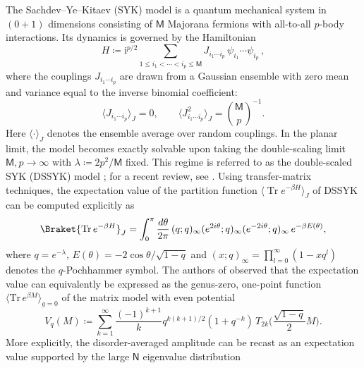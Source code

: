 \documentclass[a4paper,11pt,english]{article}
\theoremstyle{plain}
\theoremstyle{definition}
\theoremstyle{plain}
\DeclareMathOperator{\Tr}{Tr}
\newcommand{\ms}[1]{\mathsf{#1}}
\begin{document}
The Sachdev--Ye--Kitaev (SYK) model \cite{Sachdev:1992fk, Kitaev_talk, MaldacenaStanford} is a quantum mechanical system in $(0+1)$ dimensions consisting of $\ms{M}$ Majorana fermions with all-to-all $p$-body interactions. Its dynamics is governed by the Hamiltonian
\begin{equation}
    H
    \coloneqq
    \mathrm{i}^{p/2} \sum_{1 \leq i_1 < \cdots < i_p \leq \ms{M}} 
    J_{i_1 \cdots i_p} \, \psi_{i_1} \cdots \psi_{i_p}\, ,
\end{equation}
where the couplings $J_{i_1 \cdots i_p}$ are drawn from a Gaussian ensemble with zero mean and variance equal to the inverse binomial coefficient:
\begin{equation}
    \langle J_{i_1 \cdots i_p} \rangle_J = 0,
    \qquad
    \langle J_{i_1 \cdots i_p}^2 \rangle_J = \binom{\ms{M}}{p}^{-1}.
\end{equation}
Here $\langle \cdot \rangle_J$ denotes the ensemble average over random couplings. In the planar limit, the model becomes exactly solvable upon taking the double-scaling limit $\ms{M},p\to \infty$ with $\lambda \coloneqq 2p^2/\ms{M}$ fixed. This regime is referred to as the double-scaled SYK (DSSYK) model \cite{Cotler:2016fpe, Berkooz:2018qkz, Berkooz:2018jqr}; for a recent review, see \cite{BerkoozReview}. Using transfer-matrix techniques, the expectation value of the partition function $\langle \Tr e^{-\beta H} \rangle_J$ of DSSYK can be computed explicitly \cite{Erd_s_2014, Berkooz:2018qkz} as
\begin{equation}\label{eq:disk:amplitude}
    \Braket{ \Tr{e^{-\beta H}} }_J
    =
    \int_0^\pi \frac{d\theta}{2\pi} \,
        (q;q)_\infty
        (e^{2i\theta}; q )_\infty
        (e^{-2i\theta}; q )_\infty
        \,
    e^{-\beta E(\theta)} ,
\end{equation}
where $q = e^{-\lambda}$, $E(\theta) = -2\cos\theta/\sqrt{1-q}$ and $(x;q)_\infty = \prod_{l=0}^{\infty}(1-xq^l)$ denotes the $q$-Pochhammer symbol. 
The authors of \cite{JKMS23} observed that the expectation value  can equivalently be expressed as the genus-zero, one-point function $\langle \mathrm{Tr}\, e^{\beta M}\rangle_{g=0}$ of the matrix model with even potential 
\begin{equation} \label{eq:dssykPot}
    V_{q}(M)
    \coloneqq
    \sum_{k=1}^{\infty} 
        \frac{(-1)^{k+1}}{k}
        q^{k(k+1)/2} ( 1+q^{-k} ) \,
        T_{2k}\biggl( \frac{\sqrt{1-q}}{2} M \biggr) .
\end{equation}
More explicitly, the disorder-averaged amplitude  can be recast as an expectation value supported by the large $\ms{N}$ eigenvalue distribution
\end{document}
